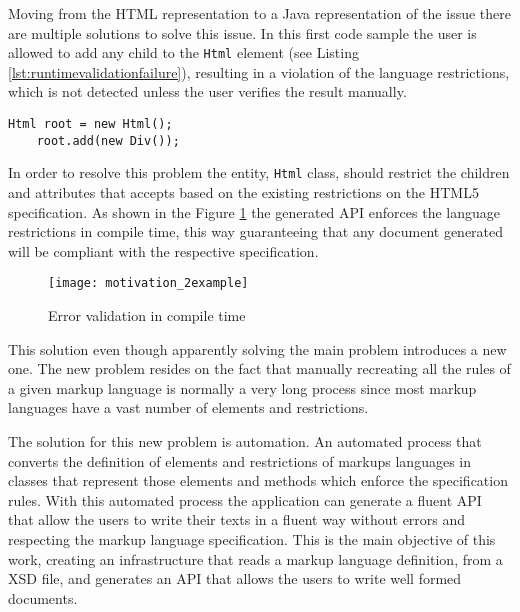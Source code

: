 \noindent
Moving from the \ac{HTML} representation to a Java representation of the issue there are multiple solutions to solve this issue. In this first code sample the user is allowed to add any child to the \texttt{Html} element (see Listing \ref{lst:runtimevalidationfailure}), resulting in a violation of the language restrictions, which is not detected unless the user verifies the result manually.

\bigskip


\begin{lstlisting}[caption={Error validation in runtime},captionpos=b,label={lst:runtimevalidationfailure}]
	Html root = new Html();
	root.add(new Div());
\end{lstlisting}

\noindent
In order to resolve this problem the entity, \texttt{Html} class, should restrict the children and attributes that accepts based on the existing restrictions on the \ac{HTML}5 specification. As shown in the Figure \ref{motivation_2example} the generated \ac{API} enforces the language restrictions in compile time, this way guaranteeing that any document generated will be compliant with the respective specification.

\begin{figure}[h]
	\centering
	\texttt{[image: motivation\_2example]}
	\caption{Error validation in compile time}
	\label{motivation_2example}
\end{figure}

\newpage

\noindent
This solution even though apparently solving the main problem introduces a new one. The new problem resides on the fact that manually recreating all the rules of a given markup language is normally a very long process since most markup languages have a vast number of elements and restrictions. 

\noindent
The solution for this new problem is automation. An automated process that converts the definition of elements and restrictions of markups languages in classes that represent those elements and methods which enforce the specification rules. With this automated process the application can generate a fluent \ac{API} that allow the users to write their texts in a fluent way without errors and respecting the markup language specification. This is the main objective of this work, creating an infrastructure that reads a markup language definition, from a \ac{XSD} file, and generates an \ac{API} that allows the users to write well formed documents.

